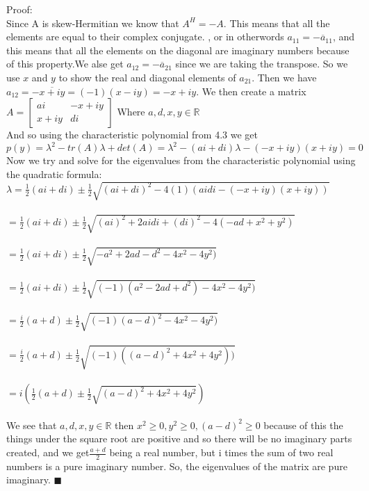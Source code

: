 \documentclass[letterpaper,12pt]{article}
\theoremstyle{definition}
\begin{document}
Proof:\\
 Since A is skew-Hermitian we know that $A^H = -A$. This means that all the elements are equal to their complex conjugate. , or in otherwords $a_{11} = -\overline a_{11}$, and this means that all the elements on the diagonal are imaginary numbers because of this property.We alse get $a_{12} = -\overline a_{21}$ since we are taking the transpose. So we use $x$ and $y$ to show the real and diagonal elements of $a_{21}$. Then we have $a_{12} = -\overline{x+iy} = (-1)(x-iy) =-x+iy$. We then create a matrix $ A = \begin{bmatrix}
    ai  &  -x+iy\\
   x+iy &  di 
 \end{bmatrix} $ Where $a,d,x,y\in \mathbb{R}$\\
 And so using the characteristic polynomial from 4.3 we get $p(y) = \lambda^2 -tr(A)\lambda +det(A) =
 \lambda^2 -(ai+di)\lambda - (-x+iy)(x+iy)= 0 $\\
 Now we try and solve for the eigenvalues from the characteristic polynomial using the quadratic formula:\\
 $\lambda = \frac{1}{2}(ai+di) \pm \frac{1}{2}\sqrt{ (ai+di)^2 -4(1)(aidi - (-x+iy)(x+iy))     } $\\\\
$  = \frac{1}{2}(ai+di) \pm \frac{1}{2}\sqrt{ (ai)^2+2aidi + (di)^2 -4(-ad +x^2 + y^2)     }$\\\\
$  = \frac{1}{2}(ai+di) \pm \frac{1}{2}\sqrt{ -a^2 + 2ad  -d^2 -4x^2  -4y^2)     }$\\\\
$  = \frac{1}{2}(ai+di) \pm \frac{1}{2}\sqrt{ (-1)(a^2 - 2ad  +d^2) -4x^2  -4y^2)     }$\\\\
$  = \frac{i}{2}(a + d) \pm \frac{1}{2}\sqrt{ (-1)(a-d)^2 -4x^2  -4y^2)     }$\\\\
$ = \frac{i}{2}(a + d) \pm \frac{1}{2}\sqrt{ (-1)((a-d)^2 +4x^2  +4y^2))     }$\\\\
$ = i\left(\frac{1}{2}(a + d) \pm \frac{1}{2}\sqrt{ (a-d)^2 +4x^2  +4y^2    }\right)$\\\\
We see that $a,d,x,y\in \mathbb{R}$ then $x^2 \geq 0, y^2 \geq 0, (a-d)^2 \geq 0$ because of this the things under the square root are positive and so there will be no imaginary parts created, and we get$\frac{a+d}{2}$ being a real number, but i times the sum of two real numbers is a pure imaginary number. So, the eigenvalues of the matrix are pure imaginary. \hfill $\blacksquare$\\
\end{document}
